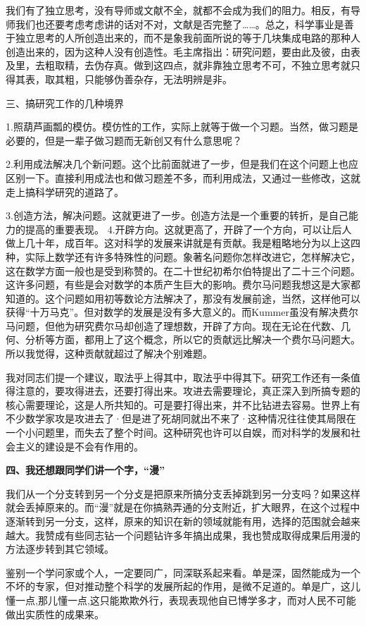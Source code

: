 \documentclass[twoside,openright,headings=optiontohead]{ctexbook} %
\begin{document}
{我们有了独立思考，没有导师或文献不全，就都不会成为我们的阻力。相反，有导师我们也还要考虑考虑讲的话对不对，文献是否完整了\ldots{}\ldots{}。总之，科学事业是善于独立思考的人所创造出来的，而不是象我前面所说的等于几块集成电路的那种人创造出来的，因为这种人没有创造性。毛主席指出：研究问题，要由此及彼，由表及里，去粗取精，去伪存真。做到这四点，就非靠独立思考不可，不独立思考就只得其表，取其粗，只能够伪善杂存，无法明辨是非。

三、搞研究工作的几种境界

1.照葫芦画瓢的模仿。模仿性的工作，实际上就等于做一个习题。当然，做习题是必要的，但是一辈子做习题而无新创又有什么意思呢？

2.利用成法解决几个新问题。这个比前面就进了一步，但是我们在这个问题上也应区别一下。直接利用成法也和做习题差不多，而利用成法，又通过一些修改，这就走上搞科学研究的道路了。

3.创造方法，解决问题。这就更进了一步。创造方法是一个重要的转折，是自己能力的提高的重要表现。
4.开辟方向。这就更高了，开辟了一个方向，可以让后人做上几十年，成百年。这对科学的发展来讲就是有贡献。我是粗略地分为以上这四种，实际上数学还有许多特殊性的问题。象著名问题你怎样改进它，怎样解决它，这在数学方面一般也是受到称赞的。在二十世纪初希尔伯特提出了二十三个问题。这许多问题，有些是会对数学的本质产生巨大的影响。费尔马问题我想这是大家都知道的。这个问题如用初等数论方法解决了，那没有发展前途，当然，这样他可以获得``十万马克''。但对数学的发展是没有多大意义的。而Kummer虽没有解决费尔马问题，但他为研究费尔马却创造了理想数，开辟了方向。现在无论在代数、几何、分析等方面，都用上了这个概念，所以它的贡献远比解决一个费尔马问题大。所以我觉得，这种贡献就超过了解决个别难题。

我对同志们提一个建议，取法乎上得其中，取法乎中得其下。研究工作还有一条值得注意的，要攻得进去，还要打得出来。攻进去需要理论，真正深入到所搞专题的核心需要理论，这是人所共知的。可是要打得出来，并不比钻进去容易。世界上有不少数学家攻是攻进去了·但是进了死胡同就出不来了·这种情况往往使其局限在一个小问题里，而失去了整个时间。这种研究也许可以自娱，而对科学的发展和社会主义的建设是不会有作用的。

\textbf{四、我还想跟同学们讲一个字，``漫''}

我们从一个分支转到另一个分攴是把原来所搞分支丢掉跳到另一分支吗？如果这样就会丢掉原来的。而``漫''就是在你搞熟弄通的分支附近，扩大眼界，在这个过程中逐渐转到另一分支，这样，原来的知识在新的领域就能有用，选择的范围就会越来越大。我赞成有些同志钻一个问题钻许多年搞出成果，我也赞成取得成果后用漫的方法逐步转到其它领域。

鉴别一个学问家或个人，一定要同广，同深联系起来看。单是深，固然能成为一个不坏的专家，但对推动整个科学的发展所起的作用，是微不足道的。单是广，这儿懂一点,那儿懂一点,这只能欺欺外行，表现表现他自已博学多才，而对人民不可能做出实质性的成果来。

}
\end{document}
